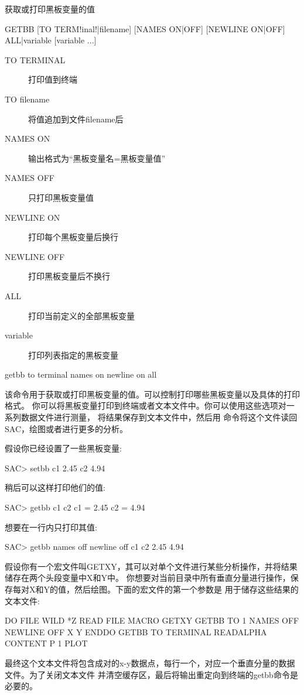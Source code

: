 \label{cmd:getbb}

获取或打印黑板变量的值

\begin{SACSTX}
GETBB [TO TERM!inal!|filename] [NAMES ON|OFF] [NEWLINE ON|OFF]
    ALL|variable [variable ...]
\end{SACSTX}

\begin{description}
\item [TO TERMINAL] 打印值到终端
\item [TO filename] 将值追加到文件filename后
\item [NAMES ON] 输出格式为``黑板变量名=黑板变量值''
\item [NAMES OFF] 只打印黑板变量值
\item [NEWLINE ON] 打印每个黑板变量后换行
\item [NEWLINE OFF] 打印黑板变量后不换行
\item [ALL] 打印当前定义的全部黑板变量
\item [variable] 打印列表指定的黑板变量
\end{description}

\begin{SACDFT}
getbb to terminal names on newline on all
\end{SACDFT}

该命令用于获取或打印黑板变量的值。可以控制打印哪些黑板变量以及具体的打印格式。
你可以将黑板变量打印到终端或者文本文件中。你可以使用这些选项对一系列数据文件进行测量，
将结果保存到文本文件中，然后用  命令将这个文件读回SAC，绘图或者进行更多的分析。

假设你已经设置了一些黑板变量:
\begin{SACCode}
SAC> setbb c1 2.45 c2 4.94
\end{SACCode}

稍后可以这样打印他们的值:
\begin{SACCode}
SAC> getbb c1 c2
 c1 = 2.45
 c2 = 4.94
\end{SACCode}

想要在一行内只打印其值:
\begin{SACCode}
SAC> getbb names off newline off c1 c2
 2.45 4.94
\end{SACCode}

假设你有一个宏文件叫GETXY，其可以对单个文件进行某些分析操作，并将结果储存在两个头段变量中X和Y中。
你想要对当前目录中所有垂直分量进行操作，保存每对X和Y的值，然后绘图。下面的宏文件的第一个参数是
用于储存这些结果的文本文件:
\begin{SACCode}
DO FILE WILD *Z
  READ FILE
  MACRO GETXY
  GETBB TO 1 NAMES OFF NEWLINE OFF X Y
ENDDO
GETBB TO TERMINAL
READALPHA CONTENT P 1
PLOT
\end{SACCode}
最终这个文本文件将包含成对的x-y数据点，每行一个，对应一个垂直分量的数据文件。为了关闭文本文件
并清空缓存区，最后将输出重定向到终端的getbb命令是必要的。
